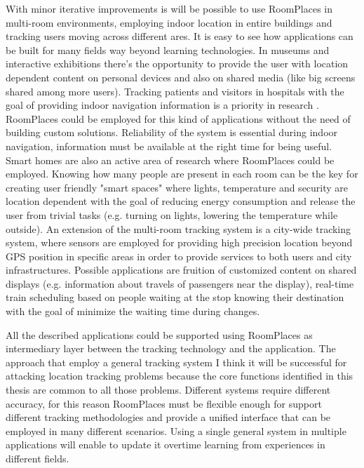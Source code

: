 With minor iterative improvements is will be possible to use RoomPlaces in multi-room environments, employing indoor location in entire buildings and tracking users moving across different ares. It is easy to see how applications can be built for many fields way beyond learning technologies. In museums and interactive exhibitions there's the opportunity to provide the user with location dependent content on personal devices and also on shared media (like big screens shared among more users). Tracking patients and visitors in hospitals with the goal of providing indoor navigation information is a priority in research \cite{yang:ibeacon}. RoomPlaces could be employed for this kind of applications without the need of building custom solutions. Reliability of the system is essential during indoor navigation, information must be available at the right time for being useful. Smart homes are also an active area of research where RoomPlaces could be employed. Knowing how many people are present in each room can be the key for creating user friendly "smart spaces" where lights, temperature and security are location dependent with the goal of reducing energy consumption and release the user from trivial tasks (e.g. turning on lights, lowering the temperature while outside). An extension of the multi-room tracking system is a city-wide tracking system, where sensors are employed for providing high precision location beyond GPS position in specific areas in order to provide services to both users and city infrastructures. Possible applications are fruition of customized content on shared displays (e.g. information about travels of passengers near the display), real-time train scheduling based on people waiting at the stop knowing their destination with the goal of minimize the waiting time during changes.

All the described applications could be supported using RoomPlaces as intermediary layer between the tracking technology and the application. The approach that employ a general tracking system I think it will be successful for attacking location tracking problems because the core functions identified in this thesis are common to all those problems. Different systems require different accuracy, for this reason RoomPlaces must be flexible enough for support different tracking methodologies and provide a unified interface that can be employed in many different scenarios. Using a single general system in multiple applications will enable to update it overtime learning from experiences in different fields.
